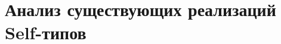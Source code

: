 \section{Анализ существующих реализаций Self-типов}

%
%

%
%
%
%
%
%
%
%
%
%
%
%
%
%
%
%
%
%
%
%
%
%
%
%
%
%
%
%
%
%
%
%
%
%
